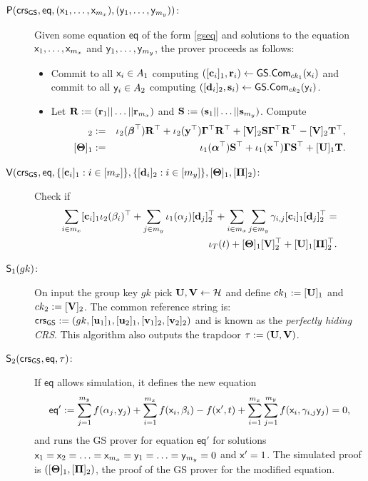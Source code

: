 \begin{description}
\item[$\mathsf{P}(\mathsf{crs}_{\mathsf{GS}},\mathsf{eq},(\mathsf{x}_1,\ldots,\mathsf{x}_{m_x}),(\mathsf{y}_1,\ldots,\mathsf{y}_{m_y}))$:] Given some equation $\mathsf{eq}$ of the form \ref{gseq} and solutions to the equation
$\mathsf{x}_1,\ldots,\mathsf{x}_{m_x}$ and $\mathsf{y}_1,\ldots,\mathsf{y}_{m_y}$, the prover proceeds as follows:
\begin{itemize}
\item Commit to all $\mathsf{x}_i \in A_1$ computing $([\mathbf{c}_i]_1,\mathbf{r}_i)\gets{\mathsf{GS}}.\mathsf{Com}_{ck_1}(\mathsf{x}_i)$ and commit to all $\mathsf{y}_i \in A_2$ computing $([\mathbf{d}_i]_2,\mathbf{s}_i)\gets{\mathsf{GS}}.\mathsf{Com}_{ck_2}(\mathsf{y}_i)$.
\item Let $\mathbf{{R}} := (\mathbf{r}_1||\ldots||\mathbf{r}_{m_x})$ and $\mathbf{{S}} := (\mathbf{s}_1||\ldots||\mathbf{s}_{m_y})$. Compute 
\begin{eqnarray*}
[\matr{\Pi}]_2 
& := & \iota_2(\boldsymbol \beta^{\top}) \matr{R}^\top +\iota_2(\vecb{y}^{\top}) \matr{\EscQE}^\top  \matr{R}^{\top}+
[\matr{V}]_2\matr{S} \matr{\EscQE}^\top \matr{R}^\top - [\matr{V}]_2 \matr{T}^\top,\\
\  [\matr{\Theta}]_1 &  := &\iota_1(\boldsymbol \alpha^{\top}) \matr{S}^\top +\iota_1(\vecb{x}^{\top}) \matr{\EscQE} \matr{S}^{\top}+ [\matr{U}]_1 \matr{T}.
 \end{eqnarray*}
\end{itemize}
\item[{$\mathsf{V}(\mathsf{crs}_{\mathsf{GS}},\mathsf{eq},\{[\mathbf{c}_i]_1:i\in[m_x]\},\{[\mathbf{d}_i]_2:i\in[m_y]\},[\mathbf{{\Theta}}]_1,[\mathbf{{\Pi}}]_2)$}:] Check if
\begin{eqnarray*}
\sum_{i \in m_x} [\mathbf{c}_i]_1 \iota_2(\beta_i)^{\top} + \sum_{j \in m_y} \iota_1(\alpha_j) [\mathbf{d}_j]_2^{\top} 
+ \sum_{i \in m_x}\sum_{j \in m_y}\gamma_{i,j} [\mathbf{c}_i]_1 [\mathbf{d}_j]_2^{\top} = \\ \iota_T(t) +[\mathbf{{\Theta}}]_1[\mathbf{{V}}]_2^\top + [\mathbf{{U}}]_1[\mathbf{{\Pi}}]_2^\top.
\end{eqnarray*}
\item[$\mathsf{S}_1(gk)$:]  On input the group key $gk$ pick $\mathbf{{U}},\mathbf{{V}}\gets\mathcal{H}$ and define $ck_1 := [\mathbf{{U}}]_1$ and $ck_2:=[\mathbf{{V}}]_2$.
   The common reference string is:
   $\mathsf{crs}_{\mathsf{GS}}:=(gk,[\mathbf{u}_1]_1,[\mathbf{u}_2]_1,[\mathbf{v}_1]_2,[\mathbf{v}_2]_2)$ and is known as the \emph{perfectly hiding CRS}. This algorithm also outputs the trapdoor $\tau:=(\mathbf{{U}},\mathbf{{V}})$.
\item[$\mathsf{S}_2(\mathsf{crs}_{\mathsf{GS}},\mathsf{eq},\tau)$:] If $\mathsf{eq}$ allows simulation, it defines the new equation
\begin{equation}
\mathsf{eq}':=\sum_{j=1}^{m_y} f(\alpha_j, \mathsf{y}_j)+\sum_{i=1}^{m_x} f(\mathsf{x}_i, \beta_i)-f(\mathsf{x}',t)+\sum_{i=1}^{m_x} \sum_{j=1}^{m_y}  f(\mathsf{x}_i,\gamma_{i,j} \mathsf{y}_j)=0,
\end{equation}
and runs the GS prover for equation $\mathsf{eq}'$ for solutions $\mathsf{x}_1=\mathsf{x}_2=\ldots=\mathsf{x}_{m_x}=\mathsf{y}_1=\ldots=\mathsf{y}_{m_y}=0$ and $\mathsf{x}'=1$. The simulated proof is $([\mathbf{{\Theta}}]_1,[\mathbf{{\Pi}}]_2)$, the proof of the GS prover for the modified equation.

\end{description}
